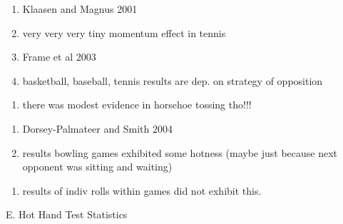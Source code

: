 \documentclass[12pt,twoside]{dukestatscithesis}
\providecommand{\tightlist}{%
  \setlength{\itemsep}{0pt}\setlength{\parskip}{0pt}}
\theoremstyle{definition}
\theoremstyle{definition}
\theoremstyle{definition}
\theoremstyle{remark}
\begin{document}
\begin{enumerate}
  \begin{enumerate}
  \def\labelenumii{\alph{enumii}.}
  \setcounter{enumii}{4}
  \tightlist
  \item
    Klaasen and Magnus 2001
  \item
    very very very tiny momentum effect in tennis
  \item
    Frame et al 2003
  \item
    basketball, baseball, tennis results are dep. on strategy of
    opposition
  \end{enumerate}
  \begin{enumerate}
  \def\labelenumii{\roman{enumii}.}
  \setcounter{enumii}{1}
  \tightlist
  \item
    there was modest evidence in horsehoe tossing tho!!!
  \end{enumerate}
  \begin{enumerate}
  \def\labelenumii{\alph{enumii}.}
  \setcounter{enumii}{6}
  \tightlist
  \item
    Dorsey-Palmateer and Smith 2004
  \item
    results bowling games exhibited some hotness (maybe just because
    next opponent was sitting and waiting)
  \end{enumerate}
  \begin{enumerate}
  \def\labelenumii{\roman{enumii}.}
  \setcounter{enumii}{1}
  \tightlist
  \item
    results of indiv rolls within games did not exhibit this.
  \end{enumerate}
\end{enumerate}
E. Hot Hand Test Statistics
\end{document}

